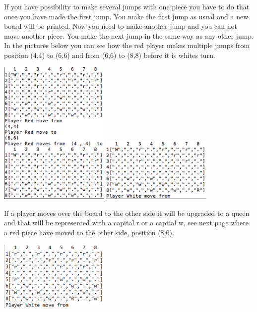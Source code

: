 \documentclass[12pt,a4paper]{article}
\begin{document}
If you have possibility to make several jumps with one piece you have to do that once you have made the first jump. You make the first jump as usual and a new board will be printed. Now you need to make another jump and you can not move another piece. You make the next jump in the same way as any other jump. In the pictures below you can see how the red player makes multiple jumps from position (4,4) to (6,6) and from (6,6) to (8,8) before it is whites turn.

\begin{center}
	\includegraphics[width= 0.4\textwidth]{mj1.PNG} \includegraphics[width= 0.4\textwidth]{mj2.PNG}
\end{center}


If a player moves over the board to the other side it will be upgraded to a queen and that will be represented with a capital r or a capital w, see next page where a red piece have moved to the other side, position (8,6).

\begin{center}
	\includegraphics[width= 0.4\textwidth]{queen.PNG}
\end{center}
\end{document}
